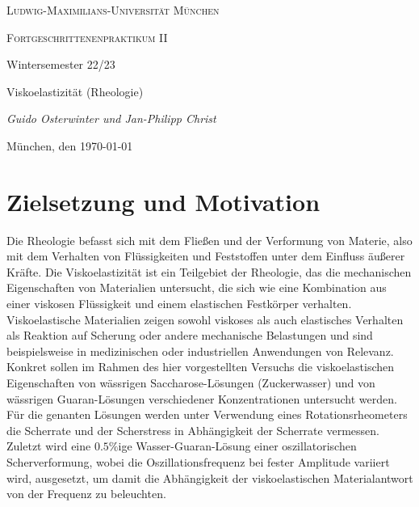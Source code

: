 \documentclass[11pt,a4paper,oneside]{scrartcl}
\begin{document}
\begin{titlepage}
	\centering
	{\scshape\LARGE Ludwig-Maximilians-Universität \linebreak München \par}
	\vspace{1cm}
	{\scshape\Large Fortgeschrittenenpraktikum II \par Wintersemester 22/23 \par}
	\vspace{1.5cm}
	{\huge\bfseries \par  Viskoelastizität (Rheologie)\par}
	\vspace{2cm}
	{\Large\itshape Guido Osterwinter und Jan-Philipp Christ \par}
	\vfill
	{\Large München, den \today\par}
	
\end{titlepage}

\tableofcontents
\newpage
\section{Zielsetzung und Motivation}

Die Rheologie befasst sich mit dem Fließen und der Verformung von Materie, also mit dem Verhalten von Flüssigkeiten und Feststoffen unter dem Einfluss äußerer Kräfte. Die Viskoelastizität ist ein Teilgebiet der Rheologie, das die mechanischen Eigenschaften von Materialien untersucht, die sich wie eine Kombination aus einer viskosen Flüssigkeit und einem elastischen Festkörper verhalten. Viskoelastische Materialien zeigen sowohl viskoses als auch elastisches Verhalten als Reaktion auf Scherung oder andere mechanische Belastungen und sind beispielsweise in medizinischen oder industriellen Anwendungen von Relevanz.\\
Konkret sollen im Rahmen des hier vorgestellten Versuchs die viskoelastischen Eigenschaften von wässrigen Saccharose-Lösungen (Zuckerwasser) und von wässrigen Guaran-Lösungen verschiedener Konzentrationen untersucht werden. Für die genanten Lösungen werden unter Verwendung eines Rotationsrheometers die Scherrate und der Scherstress  in Abhängigkeit der Scherrate vermessen.\\
Zuletzt wird eine $0.5\%$ige Wasser-Guaran-Lösung einer oszillatorischen Scherverformung, wobei die Oszillationsfrequenz bei fester Amplitude variiert wird, ausgesetzt, um damit die Abhängigkeit der viskoelastischen Materialantwort  von der Frequenz zu beleuchten.
\end{document}
